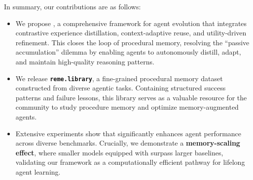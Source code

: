 In summary, our contributions are as follows:
\begin{itemize}[leftmargin=12pt,topsep=2pt,itemsep=2pt]
    \item We propose \textbf{\ours}, a comprehensive framework for agent evolution that integrates contrastive experience distillation, context-adaptive reuse, and utility-driven refinement. This closes the loop of procedural memory, resolving the ``passive accumulation'' dilemma by enabling agents to autonomously distill, adapt, and maintain high-quality reasoning patterns.
    
    \item We release \textbf{\texttt{reme.library}}, a fine-grained procedural memory dataset constructed from diverse agentic tasks. Containing structured success patterns and failure lessons, this library serves as a valuable resource for the community to study procedure memory and optimize memory-augmented agents.
    
    \item Extensive experiments show that {\ours} significantly enhances agent performance across diverse benchmarks. Crucially, we demonstrate a \textbf{memory-scaling effect}, where smaller models equipped with {\ours} surpass larger baselines, validating our framework as a computationally efficient pathway for lifelong agent learning.
\end{itemize}
